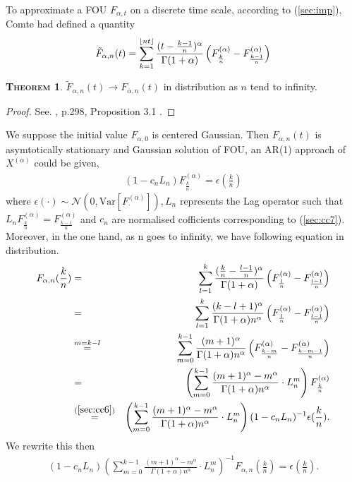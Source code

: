 \documentclass[a4paper, twoside, 11pt]{article}
\theoremstyle{definition}
\newtheorem{theorem}[definition]{\scshape Theorem}
\DeclarePairedDelimiter\floor{\lfloor}{\rfloor}
\newcommand{\brkt}[1]{\left({#1} \right)}
\begin{document}
To approximate a FOU $ F_{\alpha,t}$ on a discrete time scale, according to (\ref{sec:imp}), Comte had defined a quantity
\begin{eqnarray}
 \tilde{F}_{\alpha,n}(t) = \sum_{k=1}^{\floor{nt}} \frac{(t - \frac{k-1}{n})^\alpha}{\Gamma(1+\alpha)} \brkt{F^{(\alpha)}_{\frac{k}{n}} - F^{(\alpha)}_{\frac{k-1}{n}}}
  \label{sec:cc7}
\end{eqnarray}
\begin{theorem}
  $\tilde{F}_{\alpha,n}(t)\rightarrow F_{\alpha,n}(t)$ in distribution as $n$ tend to infinity.  
  \label{sec:cont}
\end{theorem}
\begin{proof}
  See. \cite{comren}, p.298, Proposition 3.1 .
\end{proof}
We suppose the initial value $F_{\alpha, 0}$ is centered Gaussian. Then  ${F}_{\alpha, n}(t)$ is asymtotically stationary and Gaussian solution of FOU,  an AR(1) approach of $X^{(\alpha)}$ could be given,
\begin{eqnarray}
  (1-c_nL_n) {F}^{(\alpha)}_{\frac{k}{n}} = \epsilon(\frac{k}{n})
  \label{sec:cc6}
\end{eqnarray}
where $\epsilon(\cdot) \sim \mathcal{N}(0, \mathrm{Var}[F^{(\alpha)}_{\cdot}]), L_n $ represents the Lag operator such that $L_n F^{(\alpha)}_{\frac{k}{n}} = F^{(\alpha)}_{\frac{k-1}{n}}$  and $c_n$ are normalised cofficients corresponding to (\ref{sec:cc7}). Moreover, in the one hand, as n goes to infinity, we have following equation in distribution.
\begin{eqnarray}
  F_{\alpha,n}(\frac{k}{n}) &=& \sum_{l=1}^{k} \frac{(\frac{k}{n} - \frac{l-1}{n})^\alpha}{\Gamma(1+\alpha)} \brkt{F^{(\alpha)}_{\frac{l}{n}} - F^{(\alpha)}_{\frac{l-1}{n}}}\nonumber\\
  &=& \sum_{l=1}^{k} \frac{(k - l + 1)^\alpha}{\Gamma(1+\alpha)n^\alpha} \brkt{F^{(\alpha)}_{\frac{l}{n}} - F^{(\alpha)}_{\frac{l-1}{n}}}\nonumber\\
  &\overset{m=k-l}{=}& \sum_{m=0}^{k-1} \frac{(m + 1)^\alpha}{\Gamma(1+\alpha)n^\alpha} \brkt{F^{(\alpha)}_{\frac{k-m}{n}} - F^{(\alpha)}_{\frac{k-m-1}{n}}}\nonumber\\ 
  &=& \brkt{\sum_{m=0}^{k-1} \frac{(m + 1)^\alpha - m^\alpha}{\Gamma(1+\alpha)n^\alpha} \cdot L_n^m} F^{(\alpha)}_{\frac{k}{n}} \nonumber\\
  &\overset{(\ref{sec:cc6})}{=}&  \brkt{\sum_{m=0}^{k-1} \frac{(m + 1)^\alpha - m^\alpha}{\Gamma(1+\alpha)n^\alpha} \cdot L_n^m} (1-c_nL_n)^{-1}\epsilon(\frac{k}{n}).
\end{eqnarray}
We rewrite this then
\begin{eqnarray*}
  (1-c_nL_n)\brkt{\sum_{m=0}^{k-1} \frac{(m + 1)^\alpha - m^\alpha}{\Gamma(1+\alpha)n^\alpha} \cdot L_n^m}^{-1}  F_{\alpha,n}(\frac{k}{n}) =\epsilon(\frac{k}{n}).
\end{eqnarray*}
\end{document}
